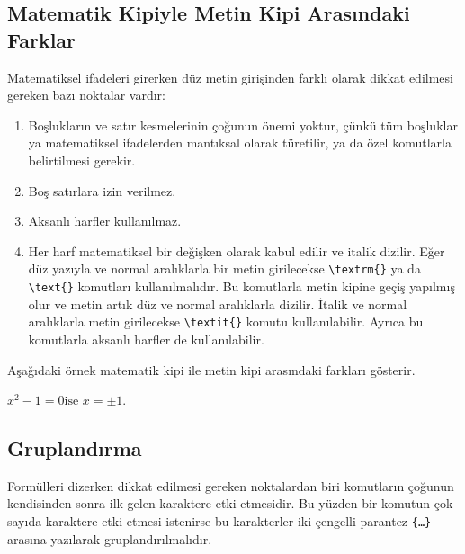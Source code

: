 \documentclass[
  10pt,
]{scrbook}
\newenvironment{Shaded}{\begin{snugshade}}{\end{snugshade}}
\newcommand{\NormalTok}[1]{#1}
\newcommand{\SpecialCharTok}[1]{\textcolor[rgb]{0.00,0.00,0.00}{#1}}
\newcommand{\SpecialStringTok}[1]{\textcolor[rgb]{0.31,0.60,0.02}{#1}}
\providecommand{\tightlist}{%
  \setlength{\itemsep}{0pt}\setlength{\parskip}{0pt}}
\theoremstyle{definition}
\theoremstyle{definition}
\theoremstyle{definition}
\theoremstyle{definition}
\theoremstyle{remark}
\begin{document}
\hypertarget{matematik-kipiyle-metin-kipi-arasux131ndaki-farklar}{%
\subsection{Matematik Kipiyle Metin Kipi Arasındaki Farklar}\label{matematik-kipiyle-metin-kipi-arasux131ndaki-farklar}}

Matematiksel ifadeleri girerken düz metin girişinden farklı olarak dikkat edilmesi gereken bazı noktalar vardır:

\begin{enumerate}
\def\labelenumi{\arabic{enumi}.}
\tightlist
\item
  Boşlukların ve satır kesmelerinin çoğunun önemi yoktur, çünkü tüm boşluklar ya matematiksel ifadelerden mantıksal olarak türetilir, ya da özel komutlarla belirtilmesi gerekir.
\item
  Boş satırlara izin verilmez.
\item
  Aksanlı harfler kullanılmaz.
\item
  Her harf matematiksel bir değişken olarak kabul edilir ve italik dizilir. Eğer düz yazıyla ve normal aralıklarla bir metin girilecekse \texttt{\textbackslash{}textrm\{\}} ya da \texttt{\textbackslash{}text\{\}} komutları kullanılmalıdır. Bu komutlarla metin kipine geçiş yapılmış olur ve metin artık düz ve normal aralıklarla dizilir. İtalik ve normal aralıklarla metin girilecekse \texttt{\textbackslash{}textit\{\}} komutu kullanılabilir. Ayrıca bu komutlarla aksanlı harfler de kullanılabilir.
\end{enumerate}

Aşağıdaki örnek matematik kipi ile metin kipi arasındaki farkları gösterir.

\begin{Shaded}
\end{Shaded}

\(x^2-1=0 \text{ise $x=\pm 1$}.\)

\hypertarget{gruplandux131rma}{%
\subsection{Gruplandırma}\label{gruplandux131rma}}

Formülleri dizerken dikkat edilmesi gereken noktalardan biri komutların çoğunun kendisinden sonra ilk gelen karaktere etki etmesidir. Bu yüzden bir komutun çok sayıda karaktere etki etmesi istenirse bu karakterler iki çengelli parantez \texttt{\{…\}} arasına yazılarak gruplandırılmalıdır.
\end{document}
